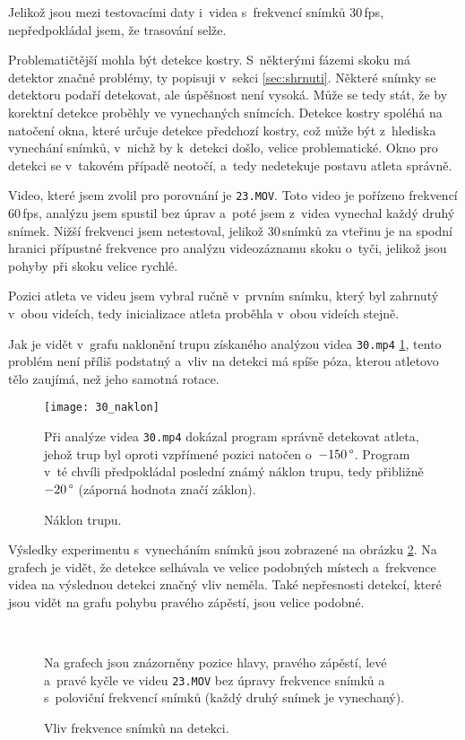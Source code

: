 Jelikož jsou mezi testovacími daty i~videa s~frekvencí snímků $30$\,\rm fps, nepředpokládal jsem, že trasování selže.

Problematičtější mohla být detekce kostry. S~některými fázemi skoku má detektor značné problémy, ty popisuji v~sekci \ref{sec:shrnuti}. Některé snímky se detektoru podaří detekovat, ale úspěšnost není vysoká. Může se tedy stát, že by korektní detekce proběhly ve vynechaných snímcích. Detekce kostry spoléhá na natočení okna, které určuje detekce předchozí kostry, což může být z~hlediska vynechání snímků, v~nichž by k~detekci došlo, velice problematické. Okno pro detekci se v~takovém případě neotočí, a~tedy nedetekuje postavu atleta správně.

Video, které jsem zvolil pro porovnání je \texttt{23.MOV}. Toto video je pořízeno frekvencí $60$\,\rm fps, analýzu jsem spustil bez úprav a~poté jsem z~videa vynechal každý druhý snímek. Nižší frekvenci jsem netestoval, jelikož $30$\,\rm snímků za vteřinu je na spodní hranici přípustné frekvence pro analýzu videozáznamu skoku o~tyči, jelikož jsou pohyby při skoku velice rychlé.

Pozici atleta ve videu jsem vybral ručně v~prvním snímku, který byl zahrnutý v~obou videích, tedy inicializace atleta proběhla v~obou videích stejně.

Jak je vidět v~grafu naklonění trupu získaného analýzou videa \texttt{30.mp4} \ref{fig:30_naklon}, tento problém není příliš podstatný a~vliv na detekci má spíše póza, kterou atletovo tělo zaujímá, než jeho samotná rotace.

\begin{figure}[h]\centering
    \texttt{[image: 30\_naklon]}
    \caption{Náklon trupu.}
    \small
    Při analýze videa \texttt{30.mp4} dokázal program správně detekovat atleta, jehož trup byl oproti vzpřímené pozici natočen o~$-150\,\rm \degree$. Program v~té chvíli předpokládal poslední známý náklon trupu, tedy přibližně $-20\,\rm \degree$ (záporná hodnota značí záklon).
    \label{fig:30_naklon}
\end{figure}

Výsledky experimentu s~vynecháním snímků jsou zobrazené na obrázku \ref{fig:fps}. Na grafech je vidět, že detekce selhávala ve velice podobných místech a~frekvence videa na výslednou detekci značný vliv neměla. Také nepřesnosti detekcí, které jsou vidět na grafu pohybu pravého zápěstí, jsou velice podobné.

\begin{figure}[h]\centering
     \\
    \caption{Vliv frekvence snímků na detekci.}
    \small
    Na grafech jsou znázorněny pozice hlavy, pravého zápěstí, levé a~pravé kyčle ve videu \texttt{23.MOV} bez úpravy frekvence snímků a s~poloviční frekvencí snímků (každý druhý snímek je vynechaný).
    \label{fig:fps}
\end{figure}

